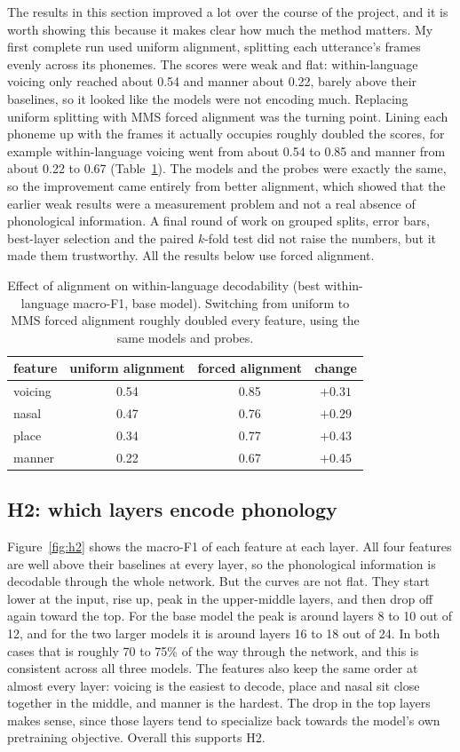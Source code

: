 \documentclass[twoside,11pt]{article}
\begin{document}
The results in this section improved a lot over the course of the project, and it
is worth showing this because it makes clear how much the method matters. My first
complete run used uniform alignment, splitting each utterance's frames evenly
across its phonemes. The scores were weak and flat: within-language voicing only
reached about 0.54 and manner about 0.22, barely above their baselines, so it
looked like the models were not encoding much. Replacing uniform splitting with MMS
forced alignment was the turning point. Lining each phoneme up with the frames it
actually occupies roughly doubled the scores, for example within-language voicing
went from about 0.54 to 0.85 and manner from about 0.22 to 0.67
(Table~\ref{tab:align}). The models and the probes were exactly the same, so the
improvement came entirely from better alignment, which showed that the earlier weak
results were a measurement problem and not a real absence of phonological
information. A final round of work on grouped splits, error bars, best-layer
selection and the paired $k$-fold test did not raise the numbers, but it made them
trustworthy. All the results below use forced alignment.

\begin{table}[t]
\centering
\begin{tabular}{lccc}
\toprule
feature & uniform alignment & forced alignment & change \\
\midrule
voicing & 0.54 & 0.85 & $+0.31$ \\
nasal   & 0.47 & 0.76 & $+0.29$ \\
place   & 0.34 & 0.77 & $+0.43$ \\
manner  & 0.22 & 0.67 & $+0.45$ \\
\bottomrule
\end{tabular}
\caption{Effect of alignment on within-language decodability (best within-language
macro-F1, base model). Switching from uniform to MMS forced alignment roughly
doubled every feature, using the same models and probes.}
\label{tab:align}
\end{table}

\subsection{H2: which layers encode phonology}
Figure~\ref{fig:h2} shows the macro-F1 of each feature at each layer. All four
features are well above their baselines at every layer, so the phonological
information is decodable through the whole network. But the curves are not flat.
They start lower at the input, rise up, peak in the upper-middle layers, and then
drop off again toward the top. For the base model the peak is around layers 8 to
10 out of 12, and for the two larger models it is around layers 16 to 18 out of
24. In both cases that is roughly 70 to 75\% of the way through the network, and
this is consistent across all three models. The features also keep the same order
at almost every layer: voicing is the easiest to decode, place and nasal sit close
together in the middle, and manner is the hardest. The drop in the top layers
makes sense, since those layers tend to specialize back towards the model's own
pretraining objective. Overall this supports H2.
\end{document}
